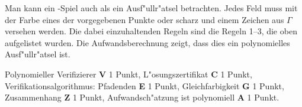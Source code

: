 \begin{loesung}
Man kann ein \spielname-Spiel auch als ein Ausf"ullr"atsel betrachten.
Jedes Feld muss mit der Farbe eines der vorgegebenen Punkte oder scharz 
und einem Zeichen aus $\Gamma$ versehen werden.
Die dabei einzuhaltenden Regeln sind die Regeln 1--3, die oben aufgelistet
wurden.
Die Aufwandsberechnung zeigt, dass dies ein polynomielles Ausf"ullr"atsel ist.
\end{loesung}

\begin{bewertung}
Polynomieller Verifizierer {\bf V} 1 Punkt,
L"osungszertifikat {\bf C} 1 Punkt,
Verifikationsalgorithmus: Pfadenden {\bf E} 1 Punkt,
Gleichfarbigkeit {\bf G} 1 Punkt,
Zusammenhang {\bf Z} 1 Punkt,
Aufwandsch"atzung ist polynomiell {\bf A} 1 Punkt.
\end{bewertung}


